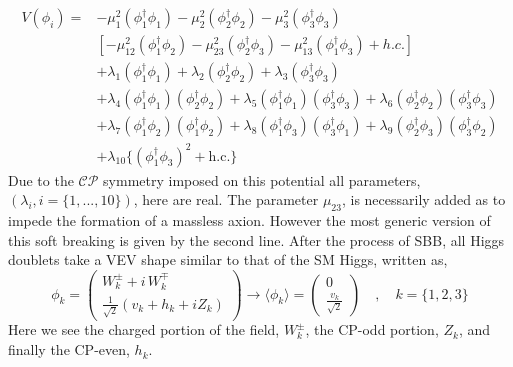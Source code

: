 \begin{equation}
\label{eq:3HDM_Scalar_Pot}
\begin{split}
V(\phi_i) = & 
- \mu_1^2 \left( \phi^{\dagger}_1 \phi_1 \right) 
- \mu_2^2 \left( \phi^{\dagger}_2 \phi_2 \right)  
- \mu_3^2 \left( \phi^{\dagger}_3 \phi_3 \right) \\ 
& \left[ - \mu_{12}^2 \left( \phi^{\dagger}_1 \phi_2  \right) 
  - \mu_{23}^2 \left( \phi^{\dagger}_2 \phi_3  \right)  
  - \mu_{13}^2 \left( \phi^{\dagger}_1 \phi_3  \right) + h.c. \right]  \\
& + \lambda_1 \left( \phi^{\dagger}_1 \phi_1 \right) 
  + \lambda_2 \left( \phi^{\dagger}_2 \phi_2 \right)  
  + \lambda_3 \left( \phi^{\dagger}_3 \phi_3 \right) \\  
& + \lambda_4 \left( \phi^{\dagger}_1 \phi_1 \right)  \left( \phi^{\dagger}_2 \phi_2 \right) 
  + \lambda_5 \left( \phi^{\dagger}_1 \phi_1 \right)  \left( \phi^{\dagger}_3 \phi_3 \right)  
  + \lambda_6 \left( \phi^{\dagger}_2 \phi_2 \right)  \left( \phi^{\dagger}_3 \phi_3 \right)  \\ 
& + \lambda_7 \left( \phi^{\dagger}_1 \phi_2 \right)  \left( \phi^{\dagger}_1 \phi_2 \right)  
  + \lambda_8 \left( \phi^{\dagger}_1 \phi_3 \right)  \left( \phi^{\dagger}_3 \phi_1 \right)   
  + \lambda_9 \left( \phi^{\dagger}_2 \phi_3 \right)  \left( \phi^{\dagger}_3 \phi_2 \right)  \\
& + \lambda_{10} \Bigg\{ \left( \phi^{\dagger}_1 \phi_3 \right)^2 + \text{h.c.} \Bigg\}   
\end{split} 
\end{equation}
%
Due to the $\mathcal{CP}$ symmetry imposed on this potential all parameters, $(\lambda_i,i=\{1,...,10\})$, here are real.
%
The parameter $\mu_{23}$, is necessarily added as to impede the formation of a massless axion. 
%
However the most generic version of this soft breaking is given by the second line.  
%
After the process of SBB, all Higgs doublets take a VEV shape similar to that of the SM Higgs, written as, 
%
\begin{equation}
\phi_k = 
\begin{pmatrix}
W_k^\pm + i \, W_k^\mp \\ 
\frac{1}{\sqrt{2}}\left( v_k + h_k + i Z_k \right)
\end{pmatrix}  \rightarrow \langle \phi_k \rangle = \begin{pmatrix}
0 \\ 
\frac{v_k}{\sqrt{2}}
\end{pmatrix} \quad , \quad k=\{ 1,2,3\} 
\label{eq:3HDM_Higgs_Field_VEV}
\end{equation} 
Here we see the charged portion of the field, $W_k^\pm$, the CP-odd portion, $Z_k$, and finally the CP-even, $h_k$. 

